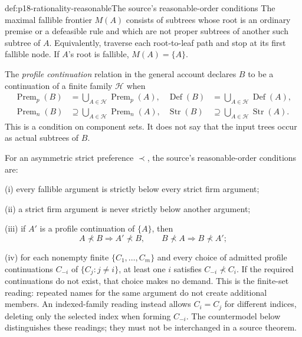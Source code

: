 \begin{hbdefinition}{def:p18-rationality-reasonable}{The source's reasonable-order conditions}
The maximal fallible frontier \(M(A)\) consists of subtrees whose root
is an ordinary premise or a defeasible rule and which are not proper
subtrees of another such subtree of \(A\). Equivalently, traverse each
root-to-leaf path and stop at its first fallible node. If \(A\)'s root
is fallible, \(M(A)=\{A\}\).

The \emph{profile continuation} relation in the general account declares
\(B\) to be a continuation of a finite family \(\mathcal H\) when
\[
\begin{aligned}
 \operatorname{Prem}_p(B)&=\bigcup_{A\in\mathcal H}\operatorname{Prem}_p(A),
 &\operatorname{Def}(B)&=\bigcup_{A\in\mathcal H}\operatorname{Def}(A),\\
 \operatorname{Prem}_n(B)&\supseteq\bigcup_{A\in\mathcal H}\operatorname{Prem}_n(A),
 &\operatorname{Str}(B)&\supseteq\bigcup_{A\in\mathcal H}\operatorname{Str}(A).
\end{aligned}
\]
This is a condition on component sets. It does not say that the input
trees occur as actual subtrees of \(B\).

For an asymmetric strict preference \(\prec\), the source's
reasonable-order conditions are:

(i) every fallible argument is strictly below every strict firm argument;

(ii) a strict firm argument is never strictly below another argument;

(iii) if \(A'\) is a profile continuation of \(\{A\}\), then
\[
 A\not\prec B\Longrightarrow A'\not\prec B,\qquad
 B\not\prec A\Longrightarrow B\not\prec A';
\]

(iv) for each nonempty finite \(\{C_1,\ldots,C_m\}\) and every choice
of admitted profile continuations \(C_{-i}\) of
\(\{C_j:j\ne i\}\), at least one \(i\) satisfies
\(C_{-i}\not\prec C_i\).
If the required continuations do not exist, that choice makes no demand.
This is the finite-set reading: repeated names for the same argument
do not create additional members. An indexed-family reading instead
allows \(C_i=C_j\) for different indices, deleting only the selected
index when forming \(C_{-i}\). The countermodel below distinguishes
these readings; they must not be interchanged in a source theorem.
\end{hbdefinition}

